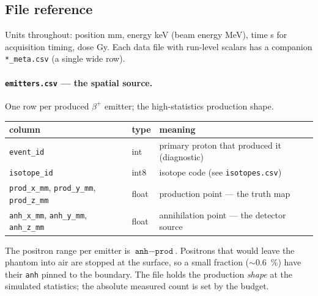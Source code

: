\documentclass[11pt]{article}
\newcommand{\bplus}{\beta^{+}}
\newcommand{\file}[1]{\texttt{#1}}
\begin{document}
\subsection{File reference}
\label{sec:files}

Units throughout: position \si{mm}, energy \si{keV} (beam energy \si{MeV}), time
\si{s} for acquisition timing, dose \si{Gy}. Each data file with run-level scalars
has a companion \file{*\_meta.csv} (a single wide row).

\paragraph{\file{emitters.csv} --- the spatial source.} One row per produced
$\bplus$ emitter; the high-statistics production shape.
\begin{center}
\begin{tabular}{@{}lll@{}}
\toprule
column & type & meaning \\
\midrule
\file{event\_id} & int & primary proton that produced it (diagnostic) \\
\file{isotope\_id} & int8 & isotope code (see \file{isotopes.csv}) \\
\file{prod\_x\_mm}, \file{prod\_y\_mm}, \file{prod\_z\_mm} & float & production point --- the truth map \\
\file{anh\_x\_mm}, \file{anh\_y\_mm}, \file{anh\_z\_mm} & float & annihilation point --- the detector source \\
\bottomrule
\end{tabular}
\end{center}
The positron range per emitter is $\file{anh}-\file{prod}$. Positrons that would
leave the phantom into air are stopped at the surface, so a small fraction
($\sim$\SI{0.6}{\percent}) have their \file{anh} pinned to the boundary. The file
holds the production \emph{shape} at the simulated statistics; the absolute
measured count is set by the budget.
\end{document}
